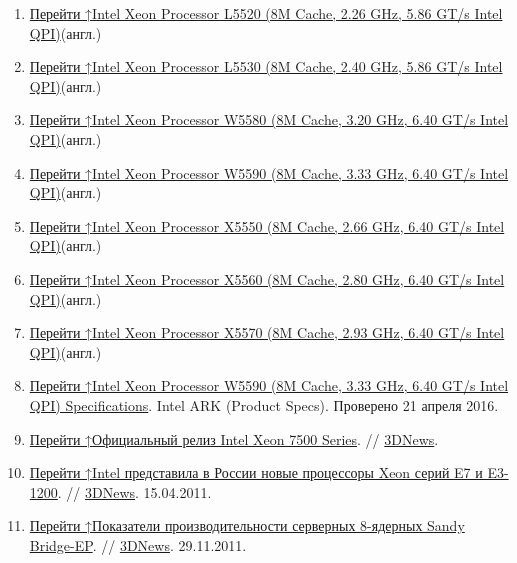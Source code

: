 \documentclass[a4paper,11pt]{article}
\begin{document}
\begin{enumerate}
	\item \hyperlink{cite_ref-10}{Перейти ↑}\href{http://ark.intel.com/Product.aspx?id=40727}{Intel Xeon Processor L5520 (8M Cache, 2.26 GHz, 5.86 GT/s Intel QPI)}\nolinebreak(англ.)
	\item \hyperlink{cite_ref-11}{Перейти ↑}\href{http://ark.intel.com/Product.aspx?id=41755}{Intel Xeon Processor L5530 (8M Cache, 2.40 GHz, 5.86 GT/s Intel QPI)}\nolinebreak(англ.)
	\item \hyperlink{cite_ref-12}{Перейти ↑}\href{http://ark.intel.com/Product.aspx?id=37113}{Intel Xeon Processor W5580 (8M Cache, 3.20 GHz, 6.40 GT/s Intel QPI)}\nolinebreak(англ.)
	\item \hyperlink{cite_ref-13}{Перейти ↑}\href{http://ark.intel.com/Product.aspx?id=41643}{Intel Xeon Processor W5590 (8M Cache, 3.33 GHz, 6.40 GT/s Intel QPI)}\nolinebreak(англ.)
	\item \hyperlink{cite_ref-14}{Перейти ↑}\href{http://ark.intel.com/Product.aspx?id=37106}{Intel Xeon Processor X5550 (8M Cache, 2.66 GHz, 6.40 GT/s Intel QPI)}\nolinebreak(англ.)
	\item \hyperlink{cite_ref-15}{Перейти ↑}\href{http://ark.intel.com/Product.aspx?id=37109}{Intel Xeon Processor X5560 (8M Cache, 2.80 GHz, 6.40 GT/s Intel QPI)}\nolinebreak(англ.)
	\item \hyperlink{cite_ref-16}{Перейти ↑}\href{http://ark.intel.com/Product.aspx?id=37111}{Intel Xeon Processor X5570 (8M Cache, 2.93 GHz, 6.40 GT/s Intel QPI)}\nolinebreak(англ.)
	\item \hyperlink{cite_ref-17}{Перейти ↑}\href{http://ark.intel.com/products/41643/Intel-Xeon-Processor-W5590-8M-Cache-3_33-GHz-6_40-GTs-Intel-QPI}{Intel Xeon Processor W5590 (8M Cache, 3.33 GHz, 6.40 GT/s Intel QPI) Specifications}.  Intel ARK (Product Specs). \scriptsize Проверено 21 апреля 2016. \normalsize
	\item \hyperlink{cite_ref-18}{Перейти ↑}\href{http://www.3dnews.ru/news/ofitsialnii_reliz_intel_xeon_7500_series}{Официальный релиз Intel Xeon 7500 Series}. // \href{https://ru.wikipedia.org/wiki/3DNews}{3DNews}.
	\item \hyperlink{cite_ref-3dnews-1_19-0}{Перейти ↑}\href{http://www.3dnews.ru/news/609624}{Intel представила в России новые процессоры Xeon серий E7 и E3-1200}. // \href{https://ru.wikipedia.org/wiki/3DNews}{3DNews}. 15.04.2011.
	\item \hyperlink{cite_ref-3dnews-2_20-0}{Перейти ↑}\href{http://www.3dnews.ru/news/620530}{Показатели производительности серверных 8-ядерных Sandy Bridge-EP}. // \href{https://ru.wikipedia.org/wiki/3DNews}{3DNews}. 29.11.2011.
\end{enumerate}
\end{document}
